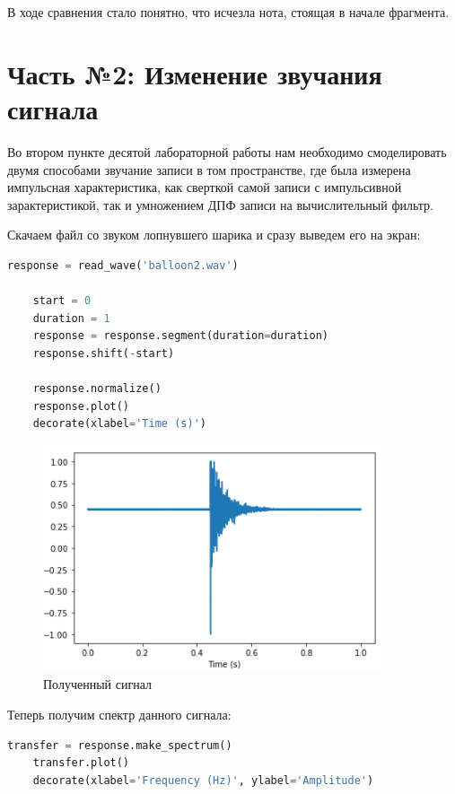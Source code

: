 \documentclass[a4paper]{article}
\begin{document}
            В ходе сравнения стало понятно, что исчезла нота, стоящая в начале фрагмента.
            
    \newpage
        \section{Часть №2: Изменение звучания сигнала}
            Во втором пункте десятой лабораторной работы нам необходимо  смоделировать двумя способами звучание записи в том пространстве, где была измерена импульсная характеристика, как сверткой самой записи с импульсивной зарактеристикой, так и умножением ДПФ записи на вычислительный фильтр.
            
            Скачаем файл со звуком лопнувшего шарика и сразу выведем его на экран:
            
\begin{lstlisting}[language=Python, caption= Получение сигнала]
    response = read_wave('balloon2.wav')

    start = 0
    duration = 1
    response = response.segment(duration=duration)
    response.shift(-start)
    
    response.normalize()
    response.plot()
    decorate(xlabel='Time (s)')
\end{lstlisting}
            
            \begin{figure}[H]
                \centering
                \includegraphics{ex_2_1.png}
                \caption{Полученный сигнал}
                \label{fig:ex_2_1}
            \end{figure}
            
            Теперь получим спектр данного сигнала:
            
\begin{lstlisting}[language=Python, caption= Получение спектра сигнала]
    transfer = response.make_spectrum()
    transfer.plot()
    decorate(xlabel='Frequency (Hz)', ylabel='Amplitude')
\end{lstlisting}
            
\end{document}
